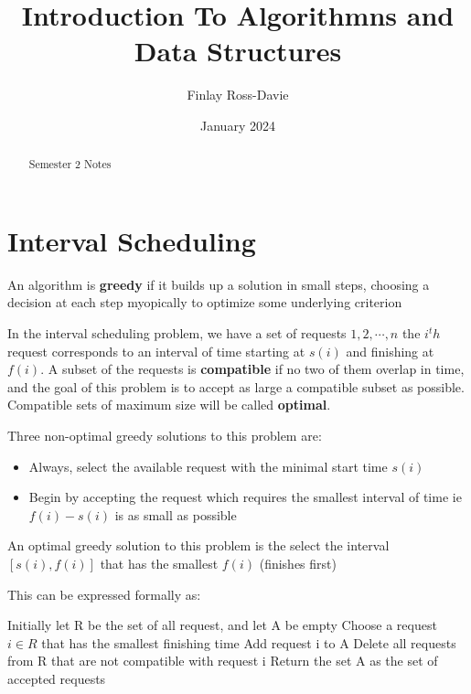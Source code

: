 \documentclass{article}
\title{Introduction To Algorithmns and Data Structures}
\author{Finlay Ross-Davie }
\date{January 2024}
\begin{document}
\maketitle
\begin{abstract}
    Semester 2 Notes
\end{abstract}

\section{Interval Scheduling}

An algorithm is \textbf{greedy} if it builds up a solution in small steps, choosing a decision at each step myopically to optimize some underlying criterion \newline

In the interval scheduling problem, we have a set of requests ${1,2,\cdots,n}$ the $i^th$ request corresponds to an interval of time starting at $s(i)$ and finishing at $f(i)$. A subset of the requests is \textbf{compatible} if no two of them overlap in time, and the goal of this problem is to accept as large a compatible subset as possible. Compatible sets of maximum size will be called \textbf{optimal}. \newline

Three non-optimal greedy solutions to this problem are:
\begin{itemize}
    \item Always, select the available request with the minimal start time $s(i)$
    \item Begin by accepting the request which requires the smallest interval of time ie $f(i) - s(i)$ is as small as possible
\end{itemize}

An optimal greedy solution to this problem is the select the interval $[s(i), f(i)]$ that has the smallest $f(i)$ (finishes first)

This can be expressed formally as: \newline

\begin{algorithmic}
    \State Initially let R be the set of all request, and let A be empty
        \State Choose a request $i \in R$ that has the smallest finishing time
        \State Add request i to A
        \State Delete all requests from R that are not compatible with request i
    \EndWhile
    \State Return the set A as the set of accepted requests 
    
\end{algorithmic}
\end{document}
